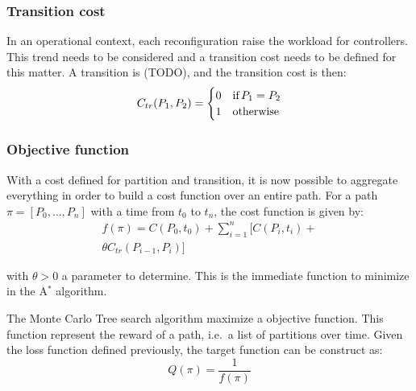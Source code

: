 \documentclass[oneside,twocolumn]{article}
\begin{document}
\subsubsection{Transition cost}

In an operational context, each reconfiguration raise the workload for
controllers. This trend needs to be considered and a transition cost needs to
be defined for this matter. A transition is (TODO), and the transition cost is
then:
\begin{equation}
  C_{tr}(P_1, P_2) =
  \begin{cases}
    0 & \text{if\,} P_1 = P_2\\
    1 & \text{otherwise}
  \end{cases}
\end{equation}

\subsubsection{Objective function}

With a cost defined for partition and transition, it is now possible to
aggregate everything in order to build a cost function over an entire
path. For a path $\pi = [P_0, \dots, P_n]$ with a time from $t_0$ to $t_n$,
the cost function is given by:
\begin{equation}
  \begin{split}
    f(\pi) = C(P_0, t_0) + \sum_{i = 1}^{n} [C(P_i, t_i) +\\
    \theta C_{tr}(P_{i-1}, P_i)]
  \end{split}
\end{equation}

with $\theta > 0$ a parameter to determine.
This is the immediate function to minimize in the A$^*$ algorithm.

The Monte Carlo Tree search algorithm maximize a objective function. This function
represent the reward of a path, i.e.\ a list of partitions over time.
Given the loss function defined previously, the target function can be
construct as:
\begin{equation}
  Q(\pi) = \frac{1}{f(\pi)}
\end{equation}








\end{document}
